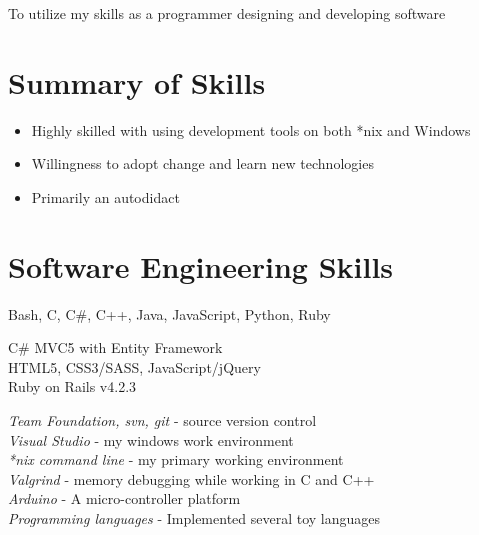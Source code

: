 \documentclass[10pt]{article} %
\begin{document}
To utilize my skills as a programmer designing and developing software


\vspace{-4mm}
\section{Summary of Skills}
\vspace{-3mm}

\begin{itemize}
\item Highly skilled with using development tools on both *nix and Windows
\vspace{-3mm}
\item Willingness to adopt change and learn new technologies
\vspace{-3mm}
\item Primarily an autodidact
\vspace{-3mm}
\end{itemize}

\section{Software Engineering Skills}
\vspace{-3mm}

{
  Bash, C, C\#, C++, Java, JavaScript, Python, Ruby
}


{
  C\# MVC5 with Entity Framework \\
  HTML5, CSS3/SASS, JavaScript/jQuery \\
  Ruby on Rails v4.2.3
}


{
\textit{Team Foundation, svn, git} - source version control \\
\textit{Visual Studio} - my windows work environment \\
\textit{*nix command line} - my primary working environment \\
\textit{Valgrind} - memory debugging while working in C and C++ \\
\textit{Arduino} - A micro-controller platform \\
\textit{Programming languages} - Implemented several toy languages
}
\end{document}

